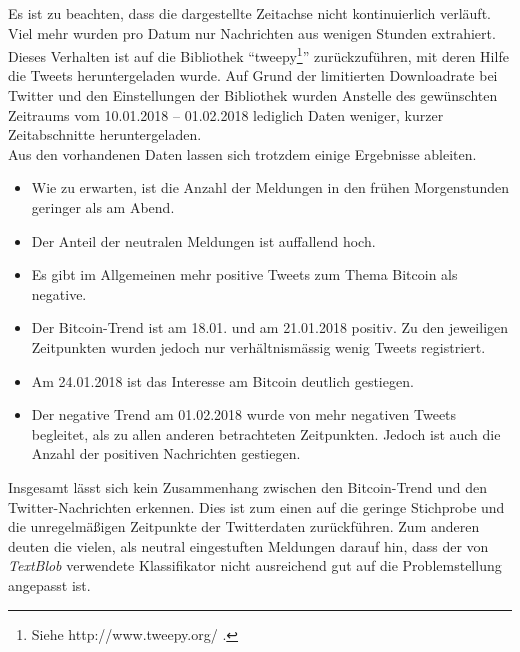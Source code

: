 Es ist zu beachten, dass die dargestellte Zeitachse nicht kontinuierlich verläuft. Viel mehr wurden pro Datum nur Nachrichten aus wenigen Stunden extrahiert. Dieses Verhalten ist auf die Bibliothek \enquote{tweepy\footnote{Siehe http://www.tweepy.org/ .}} zur\"uckzuf\"uhren, mit deren Hilfe die Tweets heruntergeladen wurde. Auf Grund der limitierten Downloadrate bei Twitter und den Einstellungen der Bibliothek wurden Anstelle des gew\"unschten Zeitraums vom 10.01.2018 -- 01.02.2018 lediglich Daten weniger, kurzer Zeitabschnitte heruntergeladen.\\
Aus den vorhandenen Daten lassen sich trotzdem einige Ergebnisse ableiten. 
\begin{itemize}
	\item Wie zu erwarten, ist die Anzahl der Meldungen in den fr\"uhen Morgenstunden geringer als am Abend.
	\item Der Anteil der neutralen Meldungen ist auffallend hoch. 
	\item Es gibt im Allgemeinen mehr positive Tweets zum Thema Bitcoin als negative.
	\item Der Bitcoin-Trend ist am 18.01. und am 21.01.2018 positiv. Zu den jeweiligen Zeitpunkten wurden jedoch nur verh\"altnism\"assig wenig Tweets registriert.
	\item Am 24.01.2018 ist das Interesse am Bitcoin deutlich gestiegen.
	\item Der negative Trend am 01.02.2018 wurde von mehr negativen Tweets begleitet, als zu allen anderen betrachteten Zeitpunkten. Jedoch ist auch die Anzahl der positiven Nachrichten gestiegen.
\end{itemize}

Insgesamt l\"asst sich kein Zusammenhang zwischen den Bitcoin-Trend und den Twitter-Nachrichten erkennen. Dies ist zum einen auf die geringe Stichprobe und die unregelm\"a{\ss}igen Zeitpunkte der Twitterdaten zur\"uckf\"uhren. Zum anderen deuten die vielen, als neutral eingestuften Meldungen darauf hin, dass der von \textit{TextBlob} verwendete Klassifikator nicht ausreichend gut auf die Problemstellung angepasst ist. 




